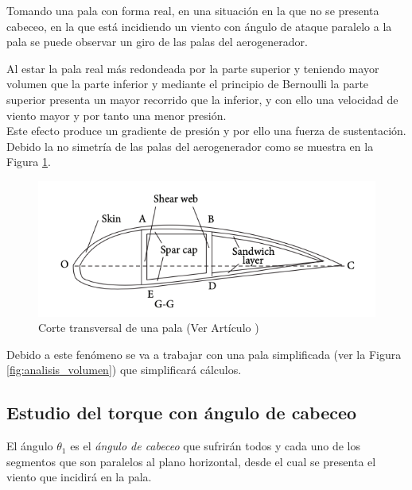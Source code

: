 Tomando una pala con forma real, en una situación en la que no se presenta cabeceo, en la que está incidiendo un viento con ángulo de ataque paralelo a la pala se puede observar un giro de las palas del aerogenerador.

Al estar la pala real más redondeada por la parte superior y teniendo mayor volumen que la parte inferior y mediante el principio de Bernoulli la parte superior presenta un mayor recorrido que la inferior, y con ello una velocidad de viento mayor y por tanto una menor presión. \\

Este efecto produce un gradiente de presión y por ello una fuerza de sustentación. Debido la no simetría de las palas del aerogenerador como se muestra en la Figura \ref{fig:corte_transversal_pala}. \\

    \begin{figure}[H]
    \centering
    \includegraphics[width=1\textwidth]{images/Cross secction pala articulo.png}
    \caption{Corte transversal de una pala (Ver Artículo \cite{Zheng2014})}
    \label{fig:corte_transversal_pala}
    \end{figure}


Debido a este fenómeno se va a trabajar con una pala simplificada (ver la Figura \ref{fig:analisis_volumen}) que simplificará cálculos. \\



\subsection{Estudio del torque con ángulo de cabeceo}
\label{section:torque_giro_inicial}

El ángulo $ \theta_1 $ es el \textit{ángulo de cabeceo} que sufrirán todos y cada uno de los segmentos que son paralelos al plano horizontal, desde el cual se presenta el viento que incidirá en la pala.\\


